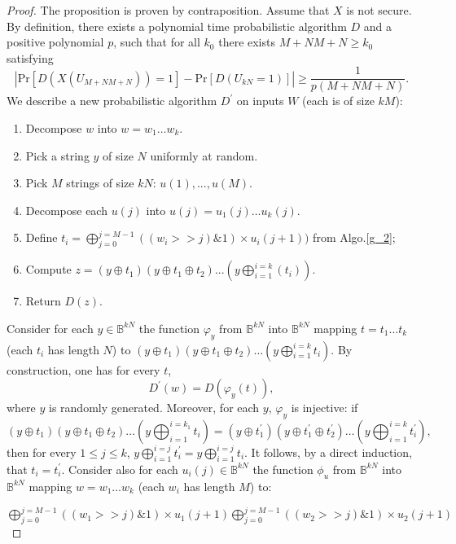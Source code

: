 \begin{proof}
The proposition is proven by contraposition. Assume that $X$ is not
secure. By definition, there exists a polynomial time probabilistic
algorithm $D$ and a positive polynomial $p$, such that for all $k_0$ there exists
$M+NM+N \geq k_0$ satisfying 
$$| \mathrm{Pr}[D(X(U_{M+NM+N}))=1]-\mathrm{Pr}[D(U_{kN}=1)]|\geq \frac{1}{p(M+NM+N)}.$$
We describe a new probabilistic algorithm $D^\prime$ on inputs $W$ 
(each is of size $kM$):
\begin{enumerate}
\item Decompose $w$ into $w=w_1\ldots w_{k}$.
\item Pick a string $y$ of size $N$ uniformly at random.
\item Pick $M$ strings of size $kN$: $u(1),...,u(M)$.
\item Decompose each $u(j)$ into $u(j) = u_1(j) \ldots u_k(j)$.
\item Define $t_i= \bigoplus_{j=0}^{j=M-1}((w_i>>j)\&1)\times u_{i}(j+1))$ from Algo.\ref{g_2};
\item Compute $z=(y\oplus t_1)(y\oplus t_1 \oplus t_2)...(y \bigoplus_{i=1}^{i=k}(t_i))$.
\item Return $D(z)$.
\end{enumerate}


Consider for each $y\in \mathbb{B}^{kN}$ the function $\varphi_{y}$
from $\mathbb{B}^{kN}$ into $\mathbb{B}^{kN}$ mapping $t=t_1\ldots t_k$
(each $t_i$ has length $N$) to 
$(y\oplus t_1 )(y\oplus t_1\oplus t_2)\ldots (y
  \bigoplus_{i=1}^{i=k} t_i)$. By construction, one has for every $t$,
\begin{equation}\label{PCH-14}
D^\prime(w)=D(\varphi_y(t)),
\end{equation}
where $y$ is randomly generated. 
Moreover, for each $y$, $\varphi_{y}$ is injective: if 
$$(y\oplus t_1)(y\oplus t_1\oplus t_2 ) \ldots (y\bigoplus_{i=1}^{i=k_1}
t_i )=(y\oplus t_1^\prime)(y\oplus t_1^\prime\oplus t_2^\prime)\ldots
(y\bigoplus_{i=1}^{i=k} t_i^\prime),$$ then for every $1\leq j\leq k$,
$y\bigoplus_{i=1}^{i=j} t_i^\prime=y\bigoplus_{i=1}^{i=j} t_i$. It follows,
by a direct induction, that $t_i=t_i^\prime$.
Consider also for each $u_i(j) \in \mathbb{B}^{kN}$ 
the function $\phi_u$
from $\mathbb{B}^{kN}$ into $\mathbb{B}^{kN}$ mapping $w=w_1\ldots w_k$ 
(each $w_i$ has length $M$) to: 

\noindent $\bigoplus_{j=0}^{j=M-1}((w_1>>j)\&1)\times u_{1}(j+1)\bigoplus_{j=0}^{j=M-1}((w_2>>j)\&1)\times u_{2}(j+1)$


\end{proof}
